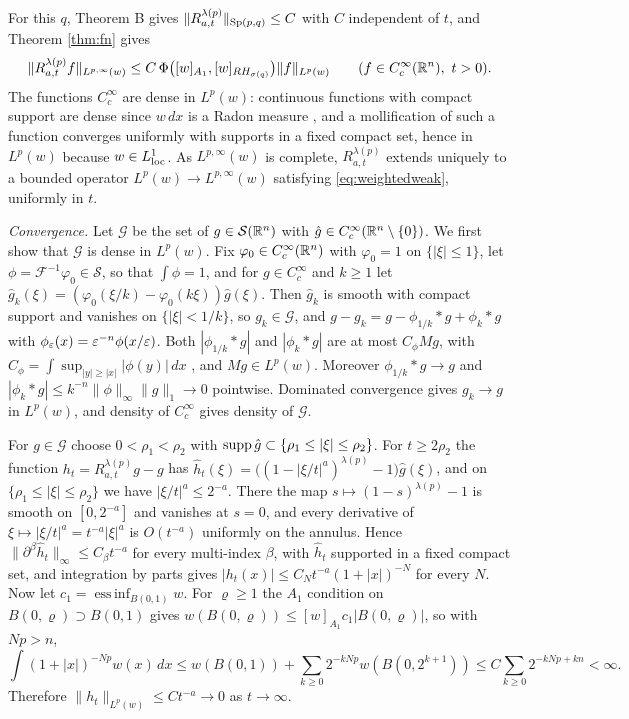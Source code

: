 For this $q$, Theorem B gives $\|R^{\lambda(p)}_{a,t}\|_{\mathrm{Sp}(p,q)}\le C$ with $C$ independent of $t$, and
Theorem \ref{thm:fn} gives
\begin{equation}\label{eq:weightedweak}
\|R^{\lambda(p)}_{a,t}f\|_{L^{p,\infty}(w)}\le C\,\Phi\bigl([w]_{A_1},[w]_{RH_{\sigma(q)}}\bigr)\|f\|_{L^p(w)}
\qquad(f\in C^\infty_c(\mathbb{R}^n),\ t>0).
\end{equation}
The functions $C^\infty_c$ are dense in $L^p(w)$: continuous functions with compact support are
dense since $w\,dx$ is a Radon measure \cite[Theorem 3.14]{Rud87}, and a mollification of such a
function converges uniformly with supports in a fixed compact set, hence in $L^p(w)$ because
$w\in L^1_{\rm loc}$. As $L^{p,\infty}(w)$ is complete, $R^{\lambda(p)}_{a,t}$ extends uniquely to a
bounded operator $L^p(w)\to L^{p,\infty}(w)$ satisfying \eqref{eq:weightedweak}, uniformly in $t$.

\emph{Convergence.} Let $\mathcal G$ be the set of $g\in\mathcal S(\mathbb{R}^n)$ with $\hat g\in C^\infty_c(\mathbb{R}^n\setminus\{0\})$.
We first show that $\mathcal G$ is dense in $L^p(w)$. Fix $\varphi_0\in C^\infty_c(\mathbb{R}^n)$ with
$\varphi_0=1$ on $\{|\xi|\le1\}$, let $\phi=\mathcal F^{-1}\varphi_0\in\mathcal S$, so that $\int\phi=1$, and
for $g\in C^\infty_c$ and $k\ge1$ let $\hat g_k(\xi)=(\varphi_0(\xi/k)-\varphi_0(k\xi))\hat g(\xi)$. Then
$\hat g_k$ is smooth with compact support and vanishes on $\{|\xi|<1/k\}$, so $g_k\in\mathcal G$, and
$g-g_k=g-\phi_{1/k}*g+\phi_k*g$ with $\phi_\varepsilon(x)=\varepsilon^{-n}\phi(x/\varepsilon)$. Both $|\phi_{1/k}*g|$ and
$|\phi_k*g|$ are at most $C_\phi Mg$, with $C_\phi=\int\sup_{|y|\ge|x|}|\phi(y)|\,dx$ \cite[Theorem 2.1.10]{Gra14}, and $Mg\in L^p(w)$. Moreover $\phi_{1/k}*g\to g$ and
$|\phi_k*g|\le k^{-n}\|\phi\|_\infty\|g\|_1\to0$ pointwise. Dominated convergence gives
$g_k\to g$ in $L^p(w)$, and density of $C^\infty_c$ gives density of $\mathcal G$.

For $g\in\mathcal G$ choose $0<\rho_1<\rho_2$ with $\operatorname{supp}\hat g\subset\{\rho_1\le|\xi|\le\rho_2\}$. For
$t\ge2\rho_2$ the function $h_t=R^{\lambda(p)}_{a,t}g-g$ has
$\hat h_t(\xi)=\bigl((1-|\xi/t|^a)^{\lambda(p)}-1\bigr)\hat g(\xi)$, and on
$\{\rho_1\le|\xi|\le\rho_2\}$ we have $|\xi/t|^a\le2^{-a}$. There the map
$s\mapsto(1-s)^{\lambda(p)}-1$ is smooth on $[0,2^{-a}]$ and vanishes at $s=0$, and every derivative of
$\xi\mapsto|\xi/t|^a=t^{-a}|\xi|^a$ is $O(t^{-a})$ uniformly on the annulus. Hence
$\|\partial^\beta\hat h_t\|_\infty\le C_\beta t^{-a}$ for every multi-index $\beta$, with $\hat h_t$
supported in a fixed compact set, and integration by parts gives
$|h_t(x)|\le C_Nt^{-a}(1+|x|)^{-N}$ for every $N$. Now let $c_1=\operatorname{ess\,inf}_{B(0,1)}w$. For
$\varrho\ge1$ the $A_1$ condition on $B(0,\varrho)\supset B(0,1)$ gives
$w(B(0,\varrho))\le[w]_{A_1}c_1|B(0,\varrho)|$, so with $Np>n$,
\[
\int(1+|x|)^{-Np}w(x)\,dx\le w(B(0,1))+\sum_{k\ge0}2^{-kNp}w(B(0,2^{k+1}))\le C\sum_{k\ge0}2^{-kNp+kn}<\infty .
\]
Therefore $\|h_t\|_{L^p(w)}\le Ct^{-a}\to0$ as $t\to\infty$.

